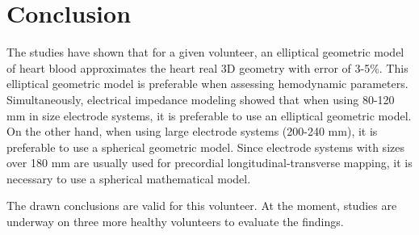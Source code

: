 \documentclass[conference]{IEEEtran}
\begin{document}
\section{Conclusion}

The studies have shown that for a given volunteer, an elliptical geometric model of  heart blood approximates the heart real 3D geometry with error of 3-5\%.
This elliptical geometric model is preferable when assessing hemodynamic parameters.
Simultaneously, electrical impedance modeling showed that when using 80-120 mm in size electrode systems, it is preferable to use an elliptical geometric model.
On the other hand, when using large electrode systems (200-240 mm), it is preferable to use a spherical geometric model.
Since electrode systems with sizes over 180 mm are usually used for precordial longitudinal-transverse mapping, it is necessary to use a spherical mathematical model.

The drawn conclusions are valid for this volunteer.
At the moment, studies are underway on three more healthy volunteers to evaluate the findings.





\vspace{12pt}
\end{document}
